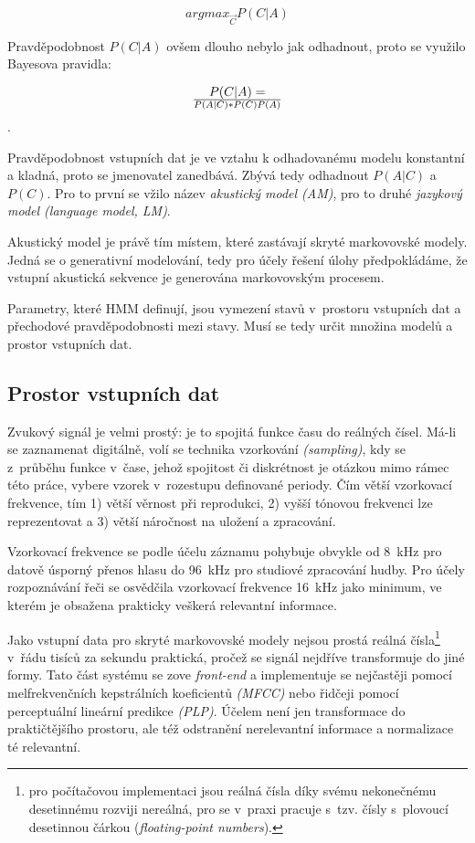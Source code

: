 \begin{equation}
argmax_{\vec{C}} P(C|A)
\end{equation}

Pravděpodobnost $P(C|A)$ ovšem dlouho nebylo jak odhadnout, proto se využilo
Bayesova pravidla:

\begin{equation}
P(C|A) = \over{P(A|C)*P(C)}{P(A)}
\end{equation}.

Pravděpodobnost vstupních dat je ve vztahu k odhadovanému modelu konstantní a
kladná, proto se jmenovatel zanedbává. Zbývá tedy odhadnout $P(A|C)$ a $P(C)$.
Pro to první se vžilo název \textit{akustický model (AM)}, pro to druhé
\textit{jazykový model (language model, LM)}.

Akustický model je právě tím místem, které zastávají skryté markovovské modely.
Jedná se o generativní modelování, tedy pro účely řešení úlohy předpokládáme, že
vstupní akustická sekvence je generována markovovským procesem.

Parametry, které HMM definují, jsou vymezení stavů v~prostoru vstupních dat a
přechodové pravděpodobnosti mezi stavy. Musí se tedy určit množina modelů a
prostor vstupních dat.

\subsection{Prostor vstupních dat}

Zvukový signál je velmi prostý: je to spojitá funkce času do reálných čísel.
Má-li se zaznamenat digitálně, volí se technika vzorkování \textit{(sampling)},
kdy se z~průběhu funkce v~čase, jehož spojitost či diskrétnost je otázkou mimo
rámec této práce, vybere vzorek v~rozestupu definované periody. Čím větší
vzorkovací frekvence, tím 1) větší věrnost při reprodukci, 2) vyšší tónovou
frekvenci lze reprezentovat a 3) větší náročnost na uložení a zpracování.

Vzorkovací frekvence se podle účelu záznamu pohybuje obvykle od 8~kHz pro
datově úsporný přenos hlasu do 96~kHz pro studiové zpracování hudby. Pro účely
rozpoznávání řeči se osvědčila vzorkovací frekvence 16~kHz jako minimum, ve
kterém je obsažena prakticky veškerá relevantní informace.

Jako vstupní data pro skryté markovovské modely nejsou prostá reálná
čísla\footnote{pro počítačovou implementaci jsou reálná čísla díky svému
nekonečnému desetinnému rozviji nereálná, pro se v~praxi pracuje s~tzv. čísly
s~plovoucí desetinnou čárkou (\textit{floating-point numbers}).} v~řádu tisíců
za sekundu praktická, pročež se signál nejdříve transformuje do jiné formy. Tato
část systému se zove \textit{front-end} a implementuje se nejčastěji pomocí
melfrekvenčních kepstrálních koeficientů \textit{(MFCC)} nebo řidčeji pomocí
perceptuální lineární predikce \textit{(PLP)}. Účelem není jen transformace do
praktičtějšího prostoru, ale též odstranění nerelevantní informace a normalizace
té relevantní.

